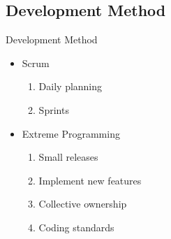 \subsection{Development Method}
\begin{frame}{Development Method}
\begin{itemize}
	\item Scrum
	\begin{enumerate}
		\item<2-> Daily planning
		\item<3-> Sprints
	\end{enumerate}
	\item Extreme Programming
	\begin{enumerate}
		\item<4-> Small releases
		\item<5-> Implement new features
		\item<6-> Collective ownership
		\item<7-> Coding standards
	\end{enumerate}
\end{itemize}
\end{frame}